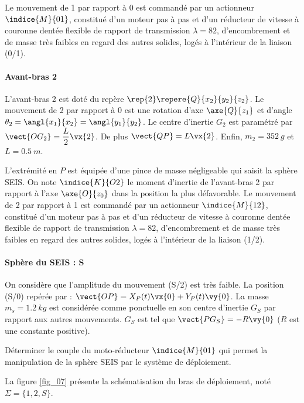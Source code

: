 Le mouvement de 1 par rapport à 0 est commandé par un actionneur $\indice{M}{01}$, constitué d’un moteur pas à pas et d’un réducteur de vitesse à couronne dentée flexible de rapport de transmission $\lambda = 82$, d’encombrement et de masse très faibles en regard des autres solides, logés à l’intérieur de la liaison (0/1).


\paragraph*{Avant-bras 2}
L'avant-bras 2 est doté du repère $\rep{2} \repere{Q}{x_2}{y_2}{z_2}$. Le mouvement de 2 par rapport à 0 est une rotation d'axe $\axe{Q}{z_1}$  et d'angle $\theta_2 = \angl{x_1}{x_2}= \angl{y_1}{y_2}$. Le centre d'inertie $G_2$ est paramétré par $\vect{OG_2} = \dfrac{L}{2} \vx{2}$. De plus $\vect{QP} = L\vx{2}$. Enfin, $m_2 = \SI{352}{g}$ et $L=\SI{0,5}{m}$.

L’extrémité en $P$ est équipée d’une pince de masse négligeable qui saisit la sphère SEIS. On note $\indice{K}{O2}$ le moment d'inertie de l'avant-bras 2 par rapport à l’axe $\axe{O}{z_0}$ dans la position la plus défavorable.  Le mouvement de 2 par rapport à 1 est commandé par un actionneur $\indice{M}{12}$, constitué d’un moteur pas à pas et d’un réducteur de vitesse à couronne dentée flexible de rapport de transmission $\lambda = 82$, d’encombrement et de masse très faibles en regard des autres solides, logés à l’intérieur de la liaison (1/2).


\paragraph*{Sphère du SEIS : S}
On considère que l’amplitude du mouvement (S/2) est très faible. La position (S/0) repérée par : $\vect{OP}= X_P(t) \vx{0} + Y_P(t) \vy{0} $. La masse $m_s = \SI{1,2}{kg}$ est considérée comme ponctuelle en son centre d’inertie $G_S$  par rapport aux autres mouvements. $G_S$  est tel que $\vect{PG_S} = -R \vy{0}$ ($R$ est une constante positive).


\begin{obj}
Déterminer le couple du moto-réducteur $\indice{M}{01}$ qui permet la manipulation de la sphère SEIS par le système de déploiement.
\end{obj}

La figure \ref{fig_07} présente la schématisation du bras de déploiement, noté $\Sigma = \{1,2,S\}$.

